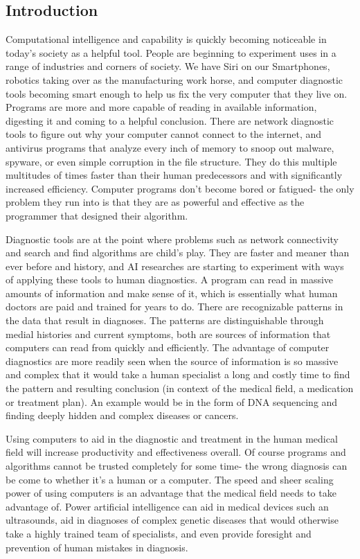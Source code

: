\documentclass[11pt]{article}
\newcommand{\tab}{\hspace*{2em}}
\begin{document}
\begin{doublespace}
\section{Introduction}

    \tab Computational intelligence and capability is quickly becoming noticeable in today's society as a helpful tool. People are 
beginning to experiment uses in a range of industries and corners of society. We have Siri on our Smartphones, robotics 
taking over as the manufacturing work horse, and computer diagnostic tools becoming smart enough to help us fix the 
very computer that they live on. Programs are more and more capable of reading in available information, digesting it 
and coming to a helpful conclusion. There are network diagnostic tools to figure out why your computer cannot connect
to the internet, and antivirus programs that analyze every inch of memory to snoop out malware, spyware, or even simple
corruption in the file structure. They do this multiple multitudes of times faster than their human predecessors and with
significantly increased efficiency. Computer programs don't become bored or fatigued- the only problem they run into is that 
they are as powerful and effective as the programmer that designed their algorithm. 

    \tab Diagnostic tools are at the point where problems such as network connectivity and search and find algorithms are 
child's play. They are faster and meaner than ever before and history, and AI researches are starting to experiment 
with ways of applying these tools to human diagnostics. A program can read in massive amounts of information and 
make sense of it, which is essentially what human doctors are paid and trained for years to do. There are 
recognizable patterns in the data that result in diagnoses. The patterns are distinguishable through medial histories 
and current symptoms, both are sources of information that computers can read from quickly and efficiently. The advantage 
of computer diagnostics are more readily seen when the source of information is so massive and complex that it would take 
a human specialist a long and costly time to find the pattern and resulting conclusion (in context of the medical field, 
a medication or treatment plan). An example would be in the form of  DNA sequencing and finding deeply hidden and 
complex diseases or cancers. 

    \tab Using computers to aid in the diagnostic and treatment in the human medical field will increase productivity and 
effectiveness overall. Of course programs and algorithms cannot be trusted completely for some time- the wrong diagnosis can
 be come to whether it's a human or a computer. The speed and sheer scaling power of using computers is an advantage that
 the medical field needs to take advantage of. Power artificial intelligence can aid in medical devices such an ultrasounds,
 aid in diagnoses of complex genetic diseases that would otherwise take a highly trained team of specialists, and even provide
 foresight and prevention of human mistakes in diagnosis.  


\end{doublespace}
\end{document}
